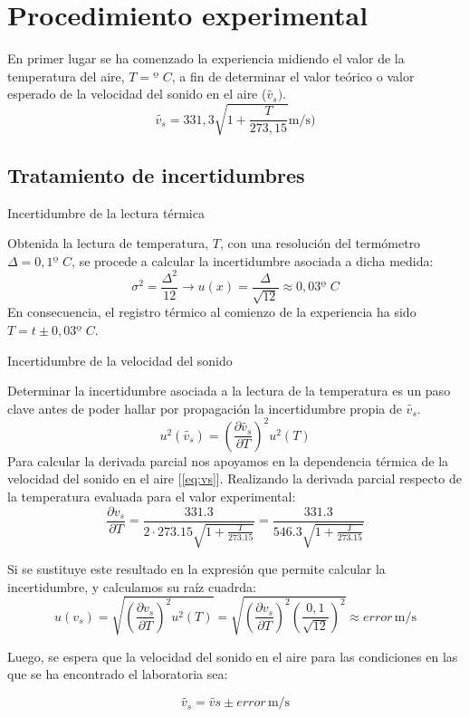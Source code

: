 \documentclass[a4paper,11pt]{article}
\begin{document}
\newpage
\section{Procedimiento experimental}
 En primer lugar se ha comenzado la experiencia midiendo el valor de la temperatura del aire, $T= \text{º }C$, a fin de determinar el valor teórico o valor esperado de la velocidad del sonido en el aire ($\tilde{v_s})$.
\begin{equation}
    \tilde{v_{s}} = 331,3 \sqrt{1+\frac{T}{273,15}}\unit{\meter\per\second})
    \label{eq:vs}
\end{equation}
\subsection{Tratamiento de incertidumbres}
\begin{resultado}{Incertidumbre de la lectura térmica}
    

Obtenida la lectura de temperatura, $T$, con una resolución del termómetro $\Delta = 0,1  \text{º }C$, se procede a calcular la incertidumbre asociada a dicha medida:
\[\sigma^2 = \frac{\Delta^2}{12} \xrightarrow{} u(x) = \frac{\Delta}{\sqrt{12}} \approx
0,03  \text{º }C\] 
En consecuencia, el registro térmico al comienzo de la experiencia ha sido $T = t \pm 0,03  \textbf{º }C$.
\end{resultado}
\begin{resultado}{Incertidumbre de la velocidad del sonido}

Determinar la incertidumbre asociada a la lectura de la temperatura es un paso clave antes de poder hallar por propagación la incertidumbre propia de $\tilde{v_{s}}$.
\begin{equation*}
    u^2(\tilde{v_s}) = \left (\frac{\partial \tilde{v_s}}{\partial T}\right )^{\!2} u^2(T)
\end{equation*}
Para calcular la derivada parcial nos apoyamos en la dependencia térmica de la velocidad del sonido en el aire [\ref{eq:vs}].
Realizando la derivada parcial respecto de la temperatura evaluada para el valor experimental:
\begin{equation*}
    \frac{\partial v_s}{\partial T} = \frac{331.3}{2 \cdot 273.15 \sqrt{1 + \frac{T}{273.15}}} = \frac{331.3}{546.3 \sqrt{1 + \frac{T}{273.15}}} 
\end{equation*}

Si se sustituye este resultado en la expresión que permite calcular la incertidumbre, y calculamos su raíz cuadrda:
\begin{equation*}
    u (v_s) = \sqrt{\left (\frac{\partial v_s}{\partial T}\right)^{\!2} u^2(T)} = \sqrt{\left (\frac{\partial v_s}{\partial T}\right)^{\!2} \left(\frac{0,1}{\sqrt{12}}\right)^{\!2}} \approx error \, \unit{\meter\per\second}
\end{equation*}

Luego, se espera que la velocidad del sonido en el aire para las condiciones en las que se ha encontrado el laboratoria sea:

\[\tilde{v_s} = \tilde{vs} \pm error\,\unit{\meter\per\second}\]

\end{resultado}

\newpage


\end{document}
